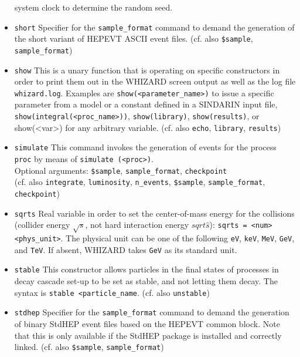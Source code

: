 \documentclass[12pt]{book}
\newcommand{\ttt}[1]{\texttt{#1}}
\begin{document}
\begin{itemize}
system clock to determine the random seed.
\item
\ttt{short} \newline 
Specifier for the \ttt{sample\_format} command to demand the
generation of the short variant of HEPEVT ASCII event
files. (cf. also \ttt{\$sample}, 
\ttt{sample\_format}) 
\item
\ttt{show} \newline
This is a unary function that is operating on specific constructors in
order to print them out in the WHIZARD screen output as well as the
log file \ttt{whizard.log}. Examples are \ttt{show(<parameter\_name>)}
to issue a specific parameter from a model or a constant defined in a
SINDARIN input file, \ttt{show(integral(<proc\_name>))},
\ttt{show(library)}, \ttt{show(results)}, or show(<var>) for any
arbitrary variable.  
(cf. also \ttt{echo}, \ttt{library}, \ttt{results})
\item
\ttt{simulate} \newline
This command invokes the generation of events for the process
\ttt{proc} by means of \ttt{simulate (<proc>)}.\\
Optional arguments:
\ttt{\$sample}, \ttt{sample\_format}, \ttt{checkpoint}\\
(cf. also \ttt{integrate}, \ttt{luminosity}, \ttt{n\_events},
\ttt{\$sample}, \ttt{sample\_format}, \ttt{checkpoint})
\item
\ttt{sqrts} \newline
Real variable in order to set the center-of-mass energy for the
collisions (collider energy $\sqrt{s}$, not hard interaction energy 
$sqrt{\hat{s}}$): \ttt{sqrts = <num> <phys\_unit>}. The physical unit
can be one of the following \ttt{eV}, \ttt{keV}, \ttt{MeV}, \ttt{GeV},
and \ttt{TeV}. If absent, WHIZARD takes \ttt{GeV} as its standard
unit. 
\item
\ttt{stable} \newline
This constructor allows particles in the final states of processes in
decay cascade set-up to be set as stable, and not letting them
decay. The syntax is  \ttt{stable <particle\_name}. (cf. also
\ttt{unstable}) 
\item
\ttt{stdhep} \newline 
Specifier for the \ttt{sample\_format} command to demand the
generation of binary StdHEP event files based on the HEPEVT common
block. Note that this is only available if the StdHEP package is
installed and correctly linked. (cf. also 
\ttt{\$sample}, \ttt{sample\_format}) 

\end{itemize}
\end{document}
